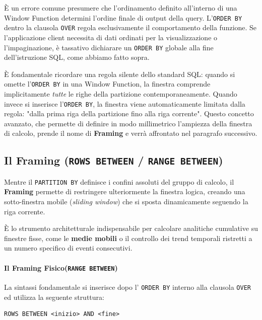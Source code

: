 \begin{warningbox}
È un errore comune presumere che l'ordinamento definito all'interno di una Window Function determini l'ordine finale di output della query. L'\texttt{ORDER BY} dentro la clausola \texttt{OVER} regola esclusivamente il comportamento della funzione. Se l'applicazione client necessita di dati ordinati per la visualizzazione o l'impaginazione, è tassativo dichiarare un \texttt{ORDER BY} globale alla fine dell'istruzione SQL, come abbiamo fatto sopra. 
\end{warningbox}

\begin{warningbox}
È fondamentale ricordare una regola silente dello standard SQL: quando si omette l'\texttt{ORDER BY} in una Window Function, la finestra comprende implicitamente \textit{tutte} le righe della partizione contemporaneamente. Quando invece si inserisce l'\texttt{ORDER BY}, la finestra viene automaticamente limitata dalla regola: "dalla prima riga della partizione fino alla riga corrente". Questo concetto avanzato, che permette di definire in modo millimetrico l'ampiezza della finestra di calcolo, prende il nome di \textbf{Framing} e verrà affrontato nel paragrafo successivo.
\end{warningbox}

\subsection{Il Framing (\texttt{ROWS BETWEEN} / \texttt{RANGE BETWEEN})}

Mentre il \texttt{PARTITION BY} definisce i confini assoluti del gruppo di calcolo, il \textbf{Framing} permette di restringere ulteriormente la finestra logica, creando una sotto-finestra mobile (\textit{sliding window}) che si sposta dinamicamente seguendo la riga corrente. 

È lo strumento architetturale indispensabile per calcolare analitiche cumulative su finestre fisse, come le \textbf{medie mobili} o il controllo dei trend temporali ristretti a un numero specifico di eventi consecutivi.

\paragraph{Il Framing Fisico(\texttt{RANGE BETWEEN})} La sintassi fondamentale si inserisce dopo l' \texttt{ORDER BY} interno alla clausola \texttt{OVER} ed utilizza la seguente struttura:
\begin{verbatim}
ROWS BETWEEN <inizio> AND <fine>
\end{verbatim}

